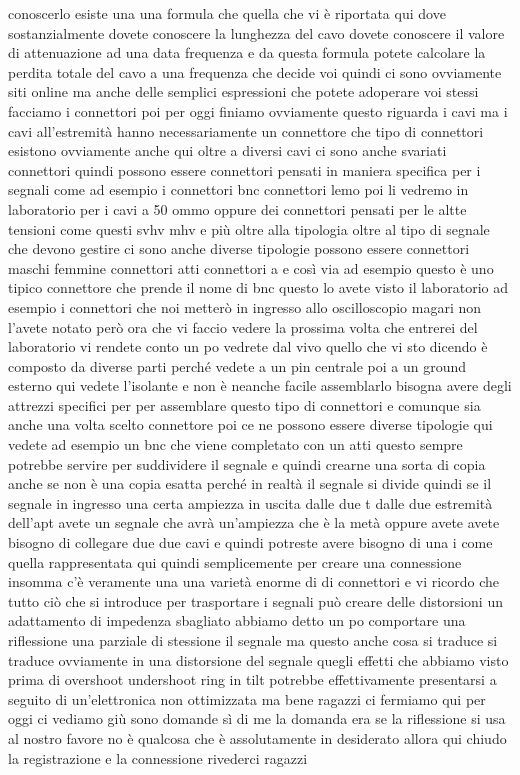 conoscerlo esiste una una formula che quella che vi è riportata qui dove sostanzialmente dovete conoscere la lunghezza del cavo dovete conoscere il valore di attenuazione ad una data frequenza e da questa formula potete calcolare la perdita totale del cavo a una frequenza che decide voi quindi ci sono ovviamente siti online ma anche delle semplici espressioni che potete adoperare voi stessi facciamo i connettori poi per oggi finiamo ovviamente questo riguarda i cavi ma i cavi all'estremità hanno necessariamente un connettore che tipo di connettori esistono ovviamente anche qui oltre a diversi cavi ci sono anche svariati connettori quindi possono essere connettori pensati in maniera specifica per i segnali come ad esempio i connettori bnc connettori lemo poi li vedremo in laboratorio per i cavi a 50 ommo oppure dei connettori pensati per le altte tensioni come questi svhv mhv e più oltre alla tipologia oltre al tipo di segnale che devono gestire ci sono anche diverse tipologie possono essere connettori maschi femmine connettori atti connettori a e così via ad esempio questo è uno tipico connettore che prende il nome di bnc questo lo avete visto il laboratorio ad esempio i connettori che noi metterò in ingresso allo oscilloscopio magari non l'avete notato però ora che vi faccio vedere la prossima volta che entrerei del laboratorio vi rendete conto un po vedrete dal vivo quello che vi sto dicendo è composto da diverse parti perché vedete a un pin centrale poi a un ground esterno qui vedete l'isolante e non è neanche facile assemblarlo bisogna avere degli attrezzi specifici per per assemblare questo tipo di connettori e comunque sia anche una volta scelto connettore poi ce ne possono essere diverse tipologie qui vedete ad esempio un bnc che viene completato con un atti questo sempre potrebbe servire per suddividere il segnale e quindi crearne una sorta di copia anche se non è una copia esatta perché in realtà il segnale si divide quindi se il segnale in ingresso una certa ampiezza in uscita dalle due t dalle due estremità dell'apt avete un segnale che avrà un'ampiezza che è la metà oppure avete avete bisogno di collegare due due cavi e quindi potreste avere bisogno di una i come quella rappresentata qui quindi semplicemente per creare una connessione insomma c'è veramente una una varietà enorme di di connettori e vi ricordo che tutto ciò che si introduce per trasportare i segnali può creare delle distorsioni un adattamento di impedenza sbagliato abbiamo detto un po comportare una riflessione una parziale di stessione il segnale ma questo anche cosa si traduce si traduce ovviamente in una distorsione del segnale quegli effetti che abbiamo visto prima di overshoot undershoot ring in tilt potrebbe effettivamente presentarsi a seguito di un'elettronica non ottimizzata ma bene ragazzi ci fermiamo qui per oggi ci vediamo giù sono domande sì di me la domanda era se la riflessione si usa al nostro favore no è qualcosa che è assolutamente in desiderato allora qui chiudo la registrazione e la connessione rivederci ragazzi

